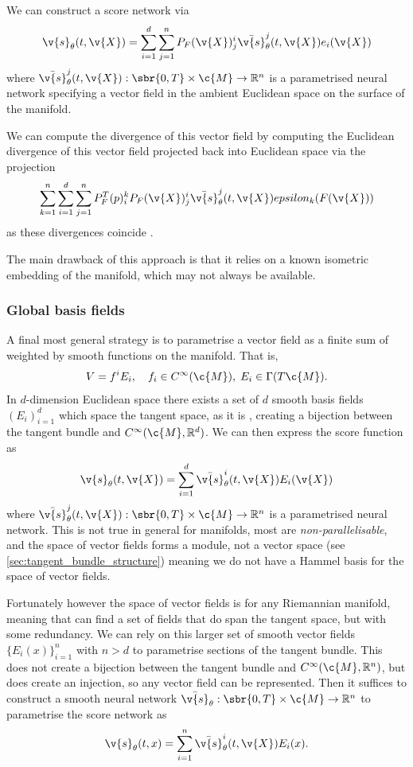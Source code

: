 We can construct a score network via
\[
	\v{s}_\theta(t, \v{X}) = \sum_{i=1}^d \sum_{j=1}^n P_F(\v{X})^i_{j} \bar{\v{s}}^j_\theta(t, \v{X}) e_i(\v{X})
\]
where \(\bar{\v{s}}^j_\theta(t, \v{X}): \sbr{0, T} \x \c{M} \to \R^n\) is a parametrised neural network specifying a vector field in the ambient Euclidean space on the surface of the manifold.

We can compute the divergence of this vector field by computing the Euclidean divergence of this vector field projected back into Euclidean space via the projection
\[
	\sum_{k=1}^n \sum_{i=1}^d \sum_{j=1}^n P^T_F(p)^k_i P_F(\v{X})^i_{j} \bar{\v{s}}^j_\theta(t, \v{X}) epsilon_k(F(\v{X}))
\]
as these divergences coincide \cite{huang2022riemannian}.

The main drawback of this approach is that it relies on a known isometric embedding of the manifold, which may not always be available.

\subsubsection{Global basis fields}
A final most general strategy is to parametrise a vector field as a finite sum of  weighted by smooth functions on the manifold.
That is,
\[
	V = f^i E_i, \quad f_i \in C^\infty(\c{M}), \; E_i \in \Gamma(T\c{M})	
.\]
In \(d\)-dimension Euclidean space there exists a set of \(d\) smooth basis fields \((E_i)_{i=1}^d\) which space the tangent space, as it is , creating a bijection between the tangent bundle and \(C^\infty(\c{M}, \R^d)\).
We can then express the score function as \[\v{s}_\theta(t, \v{X}) = \sum_{i=1}^d \bar{\v{s}}^i_\theta(t, \v{X}) E_i(\v{X})\label{eq:score_function_basis_expression}\] where \(\bar{\v{s}}^j_\theta(t, \v{X}): \sbr{0, T} \x \c{M} \to \R^n\) is a parametrised neural network.
This is not true in general for manifolds, most are \emph{non-parallelisable}, and the space of vector fields forms a module, not a vector space (see \cref{sec:tangent_bundle_structure}) meaning we do not have a Hammel basis for the space of vector fields.

Fortunately however the space of vector fields is  for any Riemannian manifold, meaning that can find a set of fields that do span the tangent space, but with some redundancy.
We can rely on this larger set of smooth vector fields \(\{E_i(x)\}_{i=1}^n\) with \(n > d\) to parametrise sections of the tangent bundle.
This does not create a bijection between the tangent bundle and \(C^\infty(\c{M}, \R^n)\), but does create an injection, so any vector field can be represented.
Then it suffices to construct a smooth neural network \(\bar{\v{s}}_\theta: \sbr{0, T} \times \c{M} \rightarrow \R^n\) to parametrise the score network as \[\v{s}_\theta(t,x) = \sum_{i=1}^n \bar{\v{s}}^i_\theta(t,\v{X}) E_i(x).\]

